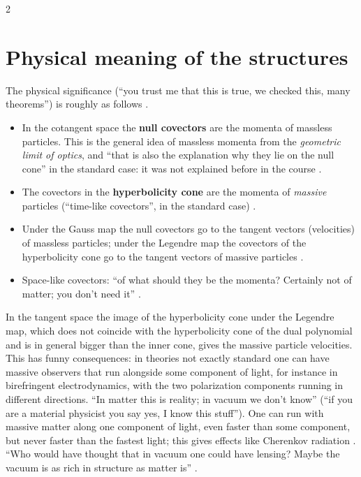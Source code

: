 \begin{paracol}{2}
\section{Physical meaning of the structures}\label{sec:c26-meaning}

The physical significance (``you trust me that this is true, we checked this, many theorems'') is roughly as follows .
\begin{itemize}
  \item In the cotangent space the \textbf{null covectors} are the momenta of massless particles. This is the general idea of massless momenta from the \emph{geometric limit of optics}, and ``that is also the explanation why they lie on the null cone'' in the standard case: it was not explained before in the course .
  \item The covectors in the \textbf{hyperbolicity cone} are the momenta of \emph{massive} particles (``time-like covectors'', in the standard case) .
  \item Under the Gauss map the null covectors go to the tangent vectors (velocities) of massless particles; under the Legendre map the covectors of the hyperbolicity cone go to the tangent vectors of massive particles .
  \item Space-like covectors: ``of what should they be the momenta? Certainly not of matter; you don't need it'' .
\end{itemize}
In the tangent space the image of the hyperbolicity cone under the Legendre map, which does not coincide with the hyperbolicity cone of the dual polynomial and is in general bigger than the inner cone, gives the massive particle velocities. This has funny consequences: in theories not exactly standard one can have massive observers that run alongside some component of light, for instance in birefringent electrodynamics, with the two polarization components running in different directions. ``In matter this is reality; in vacuum we don't know'' (``if you are a material physicist you say yes, I know this stuff''). One can run with massive matter along one component of light, even faster than some component, but never faster than the fastest light; this gives effects like Cherenkov radiation . ``Who would have thought that in vacuum one could have lensing? Maybe the vacuum is as rich in structure as matter is'' .


\end{paracol}
